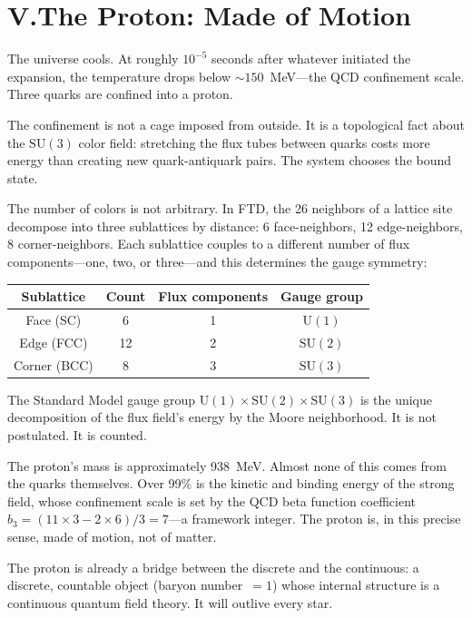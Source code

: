 \documentclass[11pt,a4paper]{article}
\begin{document}
\section*{V.\quad The Proton: Made of Motion}

The universe cools. At roughly $10^{-5}$ seconds after whatever initiated the expansion, the temperature drops below $\sim 150$~MeV---the QCD confinement scale. Three quarks are confined into a proton.

The confinement is not a cage imposed from outside. It is a topological fact about the $\mathrm{SU}(3)$ color field: stretching the flux tubes between quarks costs more energy than creating new quark-antiquark pairs. The system chooses the bound state.

The number of colors is not arbitrary. In FTD, the 26 neighbors of a lattice site decompose into three sublattices by distance: 6 face-neighbors, 12 edge-neighbors, 8 corner-neighbors. Each sublattice couples to a different number of flux components---one, two, or three---and this determines the gauge symmetry:
\begin{center}
\begin{tabular}{cccc}
\toprule
Sublattice & Count & Flux components & Gauge group \\
\midrule
Face (SC) & 6 & 1 & $\mathrm{U}(1)$ \\
Edge (FCC) & 12 & 2 & $\mathrm{SU}(2)$ \\
Corner (BCC) & 8 & 3 & $\mathrm{SU}(3)$ \\
\bottomrule
\end{tabular}
\end{center}
The Standard Model gauge group $\mathrm{U}(1) \times \mathrm{SU}(2) \times \mathrm{SU}(3)$ is the unique decomposition of the flux field's energy by the Moore neighborhood. It is not postulated. It is counted.

The proton's mass is approximately 938~MeV. Almost none of this comes from the quarks themselves. Over 99\% is the kinetic and binding energy of the strong field, whose confinement scale is set by the QCD beta function coefficient $b_3 = (11 \times 3 - 2 \times 6)/3 = 7$---a framework integer. The proton is, in this precise sense, made of motion, not of matter.

The proton is already a bridge between the discrete and the continuous: a discrete, countable object (baryon number~$= 1$) whose internal structure is a continuous quantum field theory. It will outlive every star.
\end{document}
